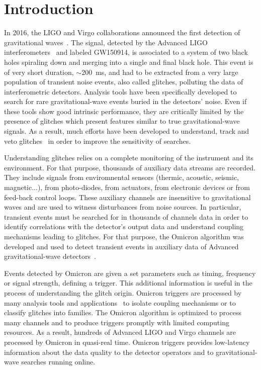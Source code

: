 \section{Introduction} \label{sec:introduction}
In 2016, the LIGO and Virgo collaborations announced the first detection of gravitational waves~\cite{Abbott:2016blz}. The signal, detected by the Advanced LIGO interferometers~\cite{Abramovici:1992ah} and labeled GW150914, is associated to a system of two black holes spiraling down and merging into a single and final black hole. This event is of very short duration, $\sim200$~ms, and had to be extracted from a very large population of transient noise events, also called glitches, polluting the data of interferometric detectors. Analysis tools have been specifically developed to search for rare gravitational-wave events buried in the detectors' noise. Even if these tools show good intrinsic performance, they are critically limited by the presence of glitches which present features similar to true gravitational-wave signals. As a result, much efforts have been developed to understand, track and veto glitches~\cite{Aasi:2012wd,Aasi:2014mqd,TheLIGOScientific:2016zmo} in order to improve the sensitivity of searches.

Understanding glitches relies on a complete monitoring of the instrument and its environment. For that purpose, thousands of auxiliary data streams are recorded. They include signals from enviromnental sensors (thermic, acoustic, seismic, magnetic...), from photo-diodes, from actuators, from electronic devices or from feed-back control loops. These auxiliary channels are insensitive to gravitational waves and are used to witness disturbances from noise sources. In particular, transient events must be searched for in thousands of channels data in order to identify correlations with the detector's output data and understand coupling mechanisms leading to glitches. For that purpose, the Omicron algorithm was developed and used to detect transient events in auxiliary data of Advanced gravitational-wave detectors~\cite{Nuttall:2015dqa,TheLIGOScientific:2016zmo}.

Events detected by Omicron are given a set parameters such as timing, frequency or signal strength, defining a trigger. This additional information is useful in the process of understanding the glitch origin. Omicron triggers are processed by many analysis tools and applications~\cite{Isogai:2010zz,Smith:2011an,gspy} to isolate coupling mechanisms or to classify glitches into families. The Omicron algorithm is optimized to process many channels and to produce triggers promptly with limited computing resources. As a result, hundreds of Advanced LIGO and Virgo channels are processed by Omicron in quasi-real time. Omicron triggers provides low-latency information about the data quality to the detector operators and to gravitational-wave searches running online.

